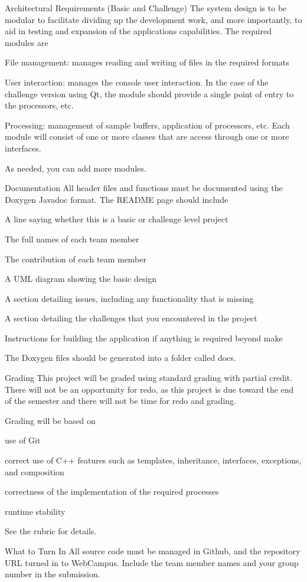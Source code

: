 Architectural Requirements (Basic and Challenge) The system design is to be modular to facilitate dividing up the development work, and more importantly, to aid in testing and expansion of the application\textquotesingle{}s capabilities. The required modules are


\begin{DoxyItemize}
\item File management\+: manages reading and writing of files in the required formats
\item User interaction\+: manages the console user interaction. In the case of the challenge version using Qt, the module should provide a single point of entry to the processors, etc.
\item Processing\+: management of sample buffers, application of processors, etc. Each module will consist of one or more classes that are access through one or more interfaces.
\end{DoxyItemize}

As needed, you can add more modules.

Documentation All header files and functions must be documented using the Doxygen Javadoc format. The R\+E\+A\+D\+ME page should include


\begin{DoxyItemize}
\item A line saying whether this is a basic or challenge level project
\item The full names of each team member
\item The contribution of each team member
\item A U\+ML diagram showing the basic design
\item A section detailing issues, including any functionality that is missing
\item A section detailing the challenges that you encountered in the project
\item Instructions for building the application if anything is required beyond make
\end{DoxyItemize}

The Doxygen files should be generated into a folder called docs.

Grading This project will be graded using standard grading with partial credit. There will not be an opportunity for redo, as this project is due toward the end of the semester and there will not be time for redo and grading.

Grading will be based on


\begin{DoxyItemize}
\item use of Git
\item correct use of C++ features such as templates, inheritance, interfaces, exceptions, and composition
\item correctness of the implementation of the required processes
\item runtime stability
\end{DoxyItemize}

See the rubric for details.

What to Turn In All source code must be managed in Github, and the repository U\+RL turned in to Web\+Campus. Include the team member names and your group number in the submission. 